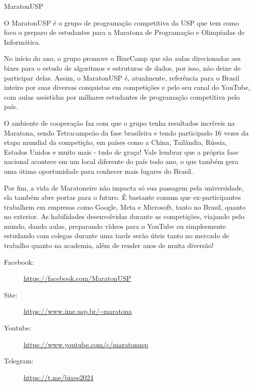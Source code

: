 \begin{subsecao}{MaratonUSP}


O MaratonUSP é o grupo de programação competitiva da USP que tem como foco o
preparo de estudantes para a Maratona de Programação e Olimpíadas de Informática.

No início do ano, o grupo promove o BixeCamp que são aulas direcionadas aes bixes
para o estudo de algoritmos e estruturas de dados, por isso, não deixe de
participar delas. Assim, o MaratonUSP é, atualmente, referência para o
Brasil inteiro por suas diversas conquistas em competições e pelo seu canal do
YouTube, com aulas assistidas por milhares estudantes de programação competitiva
pelo país.

O ambiente de cooperação faz com que o grupo tenha resultados incríveis na
Maratona, sendo Tetracampeão da fase brasileira e tendo participado 16
vezes da etapa mundial da competição, em países como a China, Tailândia,
Rússia, Estados Unidos e muito mais - tudo de graça! Vale lembrar que a própria
fase nacional acontece em um local diferente do país todo ano, o que também gera
uma ótima oportunidade para conhecer mais lugares do Brasil.

Por fim, a vida de Maratoneire não impacta só sua passagem pela universidade,
ela também abre portas para o futuro. É bastante comum que ex-participantes
trabalhem em empresas como Google, Meta e Microsoft, tanto no Brasil,
quanto no exterior. As habilidades desenvolvidas durante as competições,
viajando pelo mundo, dando aulas, preparando vídeos para o YouTube ou
simplesmente estudando com colegas durante uma tarde serão úteis tanto no
mercado de trabalho quanto na academia, além de render anos de muita diversão!

\begin{description}
\item[Facebook:] \url{https://facebook.com/MaratonUSP}
\item[Site:] \url{https://www.ime.usp.br/~maratona}
\item[Youtube:] \url{https://www.youtube.com/c/maratonusp}
\item[Telegram:] \url{https://t.me/bixes2024}
\end{description}

\end{subsecao}

